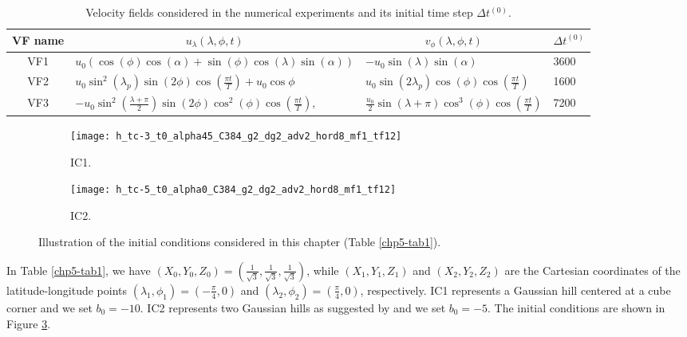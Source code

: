 \begin{table}[!ht]
	\begin{tabular}{|c|l|l|l|}
		\hline
		VF name & \multicolumn{1}{c|}{$u_\lambda(\lambda,\phi,t) $} & \multicolumn{1}{c|}{$v_\phi(\lambda,\phi,t)$}  & \multicolumn{1}{c|}{$\Delta t^{(0)}$}\\ \hline
		VF1   & $u_0(\cos(\phi)\cos(\alpha) + \sin(\phi)\cos(\lambda)\sin(\alpha))$ 
		& $-u_0\sin(\lambda)\sin(\alpha)$ & 3600  \\ \hline
		VF2   & $u_0\sin^2(\lambda_p)\sin(2\phi)\cos(\frac{\pi t}{T})+u_0\cos\phi$ 
		& $u_0\sin(2\lambda_p)\cos(\phi)\cos(\frac{\pi t}{T})$& 1600  \\ \hline
		VF3   & $-u_0\sin^2(\frac{\lambda+\pi}{2})\sin(2\phi)\cos^2(\phi)\cos(\frac{\pi t}{T}),$ 
		& $\frac{u_0}{2}\sin(\lambda+\pi)\cos^3(\phi)\cos(\frac{\pi t}{T})$ & 7200 \\ \hline
	\end{tabular}
	\caption{Velocity fields considered in the numerical experiments and its initial time step $\Delta t^{(0)}$.}
	\label{chp5-tab2}
\end{table}
\begin{figure}[!htb]
	\centering
	\begin{subfigure}{0.45\textwidth}
		\centering
		\texttt{[image: h\_tc-3\_t0\_alpha45\_C384\_g2\_dg2\_adv2\_hord8\_mf1\_tf12]}
		\caption{IC1. \label{chp5-ic1}}
	\end{subfigure}
	\begin{subfigure}{0.45\textwidth}
		\centering
		\texttt{[image: h\_tc-5\_t0\_alpha0\_C384\_g2\_dg2\_adv2\_hord8\_mf1\_tf12]}
		\caption{IC2. \label{chp5-ic2}}
	\end{subfigure}
	\caption{ Illustration of the initial conditions considered in this chapter (Table \ref{chp5-tab1}).\label{chp5-ic}}
\end{figure}


In Table \ref{chp5-tab1}, we have $(X_0,Y_0,Z_0)=(\frac{1}{\sqrt{3}},\frac{1}{\sqrt{3}},\frac{1}{\sqrt{3}})$, while 
$(X_1,Y_1,Z_1)$ and $(X_2,Y_2,Z_2)$ are the Cartesian coordinates of the latitude-longitude points
$(\lambda_1,\phi_1) = (-\frac{\pi}{4},0)$ and
$(\lambda_2,\phi_2) = ( \frac{\pi}{4},0)$, respectively.
IC1 represents a Gaussian hill centered at a cube corner and we set $b_0 = -10$.
IC2 represents two Gaussian hills as suggested by \citet{nair:2010} and we set $b_0 = -5$.
The initial conditions are shown in Figure \ref{chp5-ic}.

